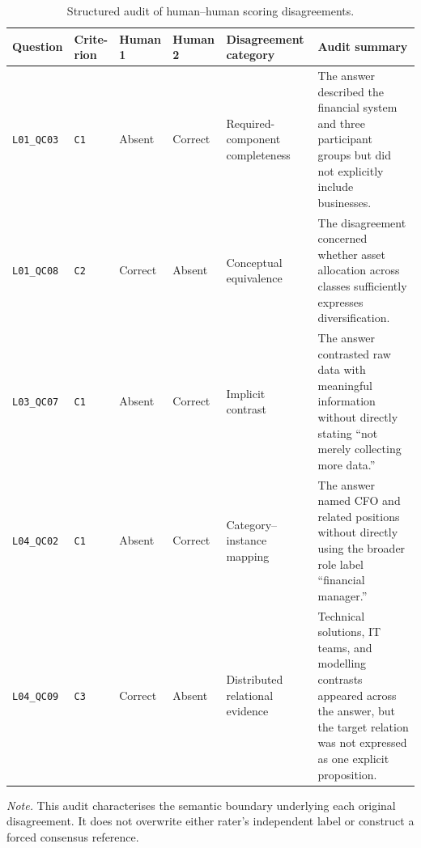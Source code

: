 \begin{table}[H]
\centering
\caption{Structured audit of human--human scoring disagreements.}
\label{tab:appendix-human-disagreement-audit}
\scriptsize
\setlength{\tabcolsep}{2pt}
\renewcommand{\arraystretch}{1.05}
\begin{tabular*}{\textwidth}{@{\extracolsep{\fill}}>{\raggedright\arraybackslash}p{}>{\raggedright\arraybackslash}p{}>{\raggedright\arraybackslash}p{}>{\raggedright\arraybackslash}p{}>{\raggedright\arraybackslash}p{}>{\raggedright\arraybackslash}p{}@{}}
\toprule
\textbf{Question} & \makecell{\textbf{Crite-}\\\textbf{rion}} & \textbf{Human 1} & \textbf{Human 2} & \textbf{Disagreement category} & \textbf{Audit summary} \\
\midrule
\texttt{L01\_QC03} & \texttt{C1} & Absent & Correct & Required-component completeness & The answer described the financial system and three participant groups but did not explicitly include businesses. \\
\texttt{L01\_QC08} & \texttt{C2} & Correct & Absent & Conceptual equivalence & The disagreement concerned whether asset allocation across classes sufficiently expresses diversification. \\
\texttt{L03\_QC07} & \texttt{C1} & Absent & Correct & Implicit contrast & The answer contrasted raw data with meaningful information without directly stating ``not merely collecting more data.'' \\
\texttt{L04\_QC02} & \texttt{C1} & Absent & Correct & Category--instance mapping & The answer named CFO and related positions without directly using the broader role label ``financial manager.'' \\
\texttt{L04\_QC09} & \texttt{C3} & Correct & Absent & Distributed relational evidence & Technical solutions, IT teams, and modelling contrasts appeared across the answer, but the target relation was not expressed as one explicit proposition. \\
\bottomrule
\end{tabular*}

\vspace{2pt}
\parbox{\textwidth}{\footnotesize\textit{Note.} This audit characterises the semantic boundary underlying each original disagreement. It does not overwrite either rater's independent label or construct a forced consensus reference.}
\end{table}
\endgroup


